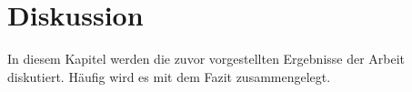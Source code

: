 \chapter{Diskussion}
\label{ch:diskussion}

In diesem Kapitel werden die zuvor vorgestellten Ergebnisse der Arbeit diskutiert. Häufig wird es mit dem Fazit zusammengelegt.